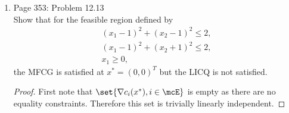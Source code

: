 \documentclass[11pt, oneside]{article}
\begin{document}
\begin{enumerate}
    \begin{proof}
      Let $f$ be a convex function and let $\Omega$, the feasible region, be
      convex.
      Suppose that $x$ is a local minimum of $f$, but not a global minimum
      This implies that there exists $x^* \Omega$, a global minimum, such that
      $f(x^*) < f(x)$.
      Since $\Omega$ is convex this implies that $tx + (1-t)x^* \in \Omega$
      for all $t \in \br{0, 1}$.
      Also since $f$ is convex,
      \begin{align*}
        f(tx + (1-t)x^*) &\le tf(x) + (1-t)f(x^*) \\
        &\le tf(x) + (1-t)f(x) \\
        &= f(x)
      \end{align*}
      Now for any local neighborhood, $N$, of $x$, there exists a
      $t \in \br{0, 1}$ such that $tx + (1-t)x^* \in N$ and
      $f(tx + (1-t)x^*) < f(x)$.
      This directly contradicts the fact that $x$ is a local minumum, therefore
      if $x$ is a local minimum it must also be a global minimum.
    \end{proof}

  \item %
    Page 353: Problem 12.13 \\
    Show that for the feasible region defined by
    \begin{align*}
      (x_1 - 1)^2 + (x_2 - 1)^2 \le 2, \\
      (x_1 - 1)^2 + (x_2 + 1)^2 \le 2, \\
      x_1 \ge 0,
    \end{align*}
    the MFCG is satisfied at $x^* = (0, 0)^T$ but the LICQ is not satisfied.

    \begin{proof}
      First note that $\set{\nabla c_i(x^*), i \in \mcE}$ is empty as there are
      no equality constraints.
      Therefore this set is trivially linearly independent.


\end{proof}
\end{enumerate}
\end{document}
